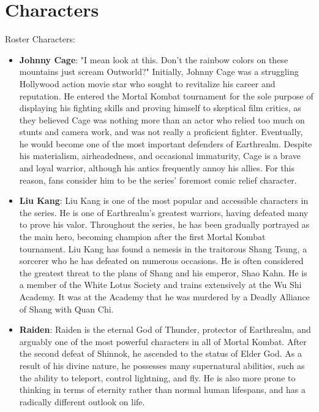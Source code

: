 \documentclass[12pt]{article}
\begin{document}
\section{Characters}
Roster Characters:
\begin{itemize}
    \item \textbf{Johnny Cage}: "I mean look at this. Don't the rainbow colors on these mountains just scream Outworld?"
    Initially, Johnny Cage was a struggling Hollywood action movie star who sought to revitalize his career and reputation. He entered the Mortal Kombat tournament for the sole purpose of displaying his fighting skills and proving himself to skeptical film critics, as they believed Cage was nothing more than an actor who relied too much on stunts and camera work, and was not really a proficient fighter. Eventually, he would become one of the most important defenders of Earthrealm. Despite his materialism, airheadedness, and occasional immaturity, Cage is a brave and loyal warrior, although his antics frequently annoy his allies. For this reason, fans consider him to be the series' foremost comic relief character.
    
    \item \textbf{Liu Kang}: Liu Kang is one of the most popular and accessible characters in the series. He is one of Earthrealm's greatest warriors, having defeated many to prove his valor. Throughout the series, he has been gradually portrayed as the main hero, becoming champion after the first Mortal Kombat tournament. Liu Kang has found a nemesis in the traitorous Shang Tsung, a sorcerer who he has defeated on numerous occasions. He is often considered the greatest threat to the plans of Shang and his emperor, Shao Kahn. He is a member of the White Lotus Society and trains extensively at the Wu Shi Academy. It was at the Academy that he was murdered by a Deadly Alliance of Shang with Quan Chi.
    
    \item \textbf{Raiden}: Raiden is the eternal God of Thunder, protector of Earthrealm, and arguably one of the most powerful characters in all of Mortal Kombat. After the second defeat of Shinnok, he ascended to the status of Elder God. As a result of his divine nature, he possesses many supernatural abilities, such as the ability to teleport, control lightning, and fly. He is also more prone to thinking in terms of eternity rather than normal human lifespans, and has a radically different outlook on life.
\end{itemize}
\end{document}
